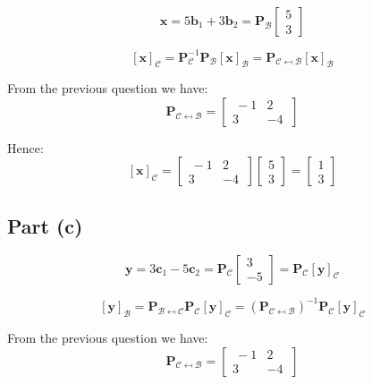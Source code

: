 \documentclass{article}
\begin{document}
\[%
    \mathbf{x} 
    =
    5 \mathbf{b}_{1} + 3 \mathbf{b}_{2} 
    =
    \mathbf{P}_{\mathcal{B}}
    \begin{bmatrix} 5 \\ 3 \end{bmatrix}
\]%

\[%
    [\mathbf{x}]_{\mathcal{C}} 
    =
    \mathbf{P}_{\mathcal{C}}^{-1}
    \mathbf{P}_{\mathcal{B}}
    [\mathbf{x}]_{\mathcal{B}}  
    = 
    \mathbf{P}_{\mathcal{C}\mapsfrom \mathcal{B}} 
    [\mathbf{x}]_{\mathcal{B}}
\]%

From the previous question we have:
\[%
    \mathbf{P}_{\mathcal{C}\mapsfrom \mathcal{B}} 
    =
    \begin{bmatrix} \ -1 & 2\\ 3 & -4 \ \end{bmatrix}
\]%

Hence:
\[%
    [\mathbf{x}]_{\mathcal{C}}
    =
    \begin{bmatrix} \ -1 & 2\\ 3 & -4 \ \end{bmatrix}
    \begin{bmatrix} 5 \\ 3 \end{bmatrix}
    =
    \left[\begin{matrix}1\\3\end{matrix}\right]
\]%

\subsection{Part (c)} 


\[%
    \mathbf{y}
    =
    3 \mathbf{c}_{1} - 5 \mathbf{c}_{2}
    = 
    \mathbf{P}_{\mathcal{C}}
    \begin{bmatrix} 3 \\ -5 \end{bmatrix}
    =
    \mathbf{P}_{\mathcal{C}}
    [\mathbf{y}]_{\mathcal{C}}
\]%

\[%
    [\mathbf{y}]_{\mathcal{B}} 
    = 
    \mathbf{P}_{\mathcal{B\mapsfrom C}}
    \mathbf{P}_{\mathcal{C}}
    [\mathbf{y}]_{\mathcal{C}}
    =
    (\mathbf{P}_{\mathcal{C\mapsfrom B}})^{-1}
    \mathbf{P}_{\mathcal{C}}
    [\mathbf{y}]_{\mathcal{C}}
\]%

From the previous question we have:
\[%
    \mathbf{P}_{\mathcal{C}\mapsfrom \mathcal{B}} 
    =
    \begin{bmatrix} \ -1 & 2\\ 3 & -4 \ \end{bmatrix}
\]%
\end{document}
